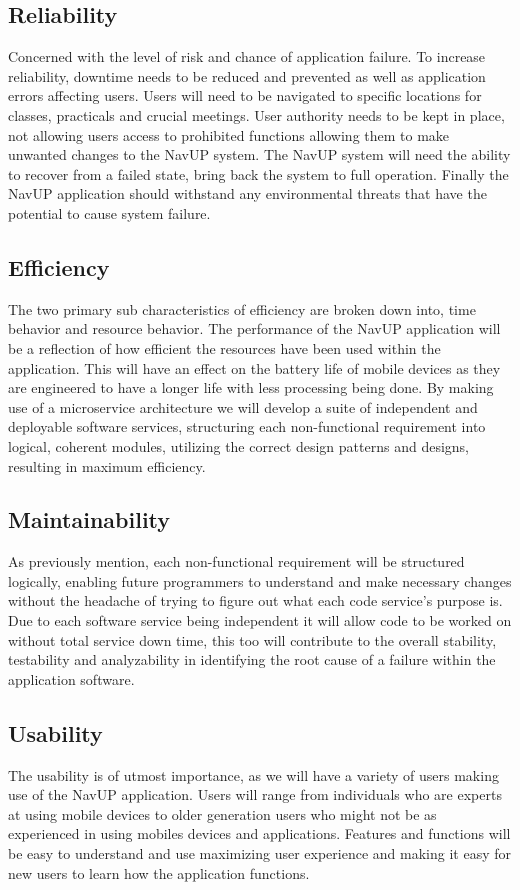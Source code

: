 \documentclass{article}
\begin{document}
		\subsection{Reliability}
		Concerned with the level of risk and chance of application failure. To increase reliability, downtime needs to be reduced and prevented as well as application errors affecting users. Users will need to be navigated to specific locations for classes, practicals and crucial meetings. User authority needs to be kept in place, not allowing users access to prohibited functions allowing them to make unwanted changes to the NavUP system. The NavUP system will need the ability to recover from a failed state, bring back the system to full operation. Finally the NavUP application should withstand any environmental threats that have the potential to cause system failure.
		 
		\subsection{Efficiency}
		The two primary sub characteristics of efficiency are broken down into, time behavior and resource behavior. The performance of the NavUP application will be a reflection of how efficient the resources have been used within the application. This will have an effect on the battery life of mobile devices as they are engineered to have a longer life with less processing being done.
		By making use of a microservice architecture we will develop a suite of independent and deployable software services, structuring each non-functional requirement into logical, coherent modules, utilizing the correct design patterns and designs, resulting in maximum efficiency.
		
		\subsection{Maintainability}
		As previously mention, each non-functional requirement will be structured logically, enabling future programmers to understand and make necessary changes without the headache of trying to figure out what each code service's purpose is. Due to each software service being independent it will allow code to be worked on without total service down time, this too will contribute to the overall stability, testability and analyzability in identifying the root cause of a failure within the application software.
		
		\subsection{Usability}
		The usability is of utmost importance, as we will have a variety of users making use of the NavUP application. Users will range from individuals who are experts at using mobile devices to older generation users who might not be as experienced in using mobiles devices and applications. Features and functions will be easy to understand and use maximizing user experience and making it easy for new users to learn how the application functions.		
	
\end{document}
